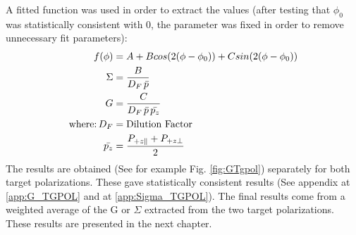 A fitted function was used in order to extract the values (after testing that $\phi_0$ was statistically consistent with 0, the parameter was fixed in order to remove unnecessary fit parameters):
\begin{align}
  f(\phi) & = A + B cos(2(\phi-\phi_0)) + C sin(2(\phi-\phi_0)) \\
  \Sigma & = \frac{B}{D_F \, \bar{p}} \\
  G & = \frac{C}{D_F \, \bar{p} \,\bar{p_z}} \\
    \textnormal{where:} \, D_F & =   \textnormal{Dilution Factor} \\
    \bar{p_z} & =  \frac{P_{+z\parallel}+P_{+z\perp}}{2}
\end{align}
The results are obtained (See for example Fig. \ref{fig:GTgpol}) separately for both target polarizations. These gave statistically consistent results (See appendix at \ref{app:G_TGPOL} and at \ref{app:Sigma_TGPOL}). The final results come from a weighted average of the G or $\Sigma$ extracted from the two target polarizations. These results are presented in the next chapter.



